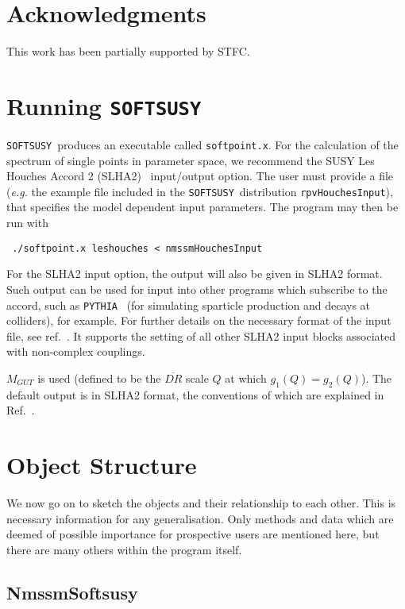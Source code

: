 \documentclass[final,3p,times,pdflatex]{elsarticle}
\def\SOFTSUSY{{\tt SOFTSUSY}}
\def\code#1{\small{\tt #1}\normalsize}
\begin{document}
\section*{Acknowledgments}
This work has been partially supported by 
STFC\@. 


\appendix

\section{Running \SOFTSUSY}
\label{sec:run}

\SOFTSUSY~produces an executable called \code{softpoint.x}. For the calculation
of the spectrum of single points in parameter space, we recommend the
SUSY Les Houches Accord 2 (SLHA2)~\cite{Allanach:2008qq}  input/output
option. The user must provide a file (\textit{e.g.} the example file included
in the \SOFTSUSY~distribution
\code{rpvHouchesInput}), that specifies the model dependent input
parameters. The program may then be run with
\small
\begin{verbatim}
 ./softpoint.x leshouches < nmssmHouchesInput
\end{verbatim}
\normalsize
For the SLHA2 input option, 
the output will also be given in 
SLHA2 format. Such output can be used for
input into other programs which subscribe to the accord, such as
\code{PYTHIA}~\cite{Sjostrand:2007gs} (for
simulating sparticle production and decays at colliders), for example. For
further details on the necessary format of 
the input file, see ref.~\cite{Allanach:2008qq}. It supports 
the setting of all other SLHA2 input blocks associated with non-complex
couplings. 

$M_{GUT}$ is used (defined to be the $\overline{DR}$ scale $Q$ at which $g_1(Q) =
g_2(Q)$). The default output is in SLHA2 format, the conventions of which are
explained in Ref.~\cite{Allanach:2008qq}. 


\section{Object Structure\label{sec:objects}}

We now go on to sketch the objects and their relationship to each other. This
is necessary information for any generalisation. Only
methods and data which are deemed of possible importance for prospective users
are 
mentioned here, but there are many others within the program itself.

\subsection{NmssmSoftsusy}
\label{nmssmsoftsusy}
\end{document}
